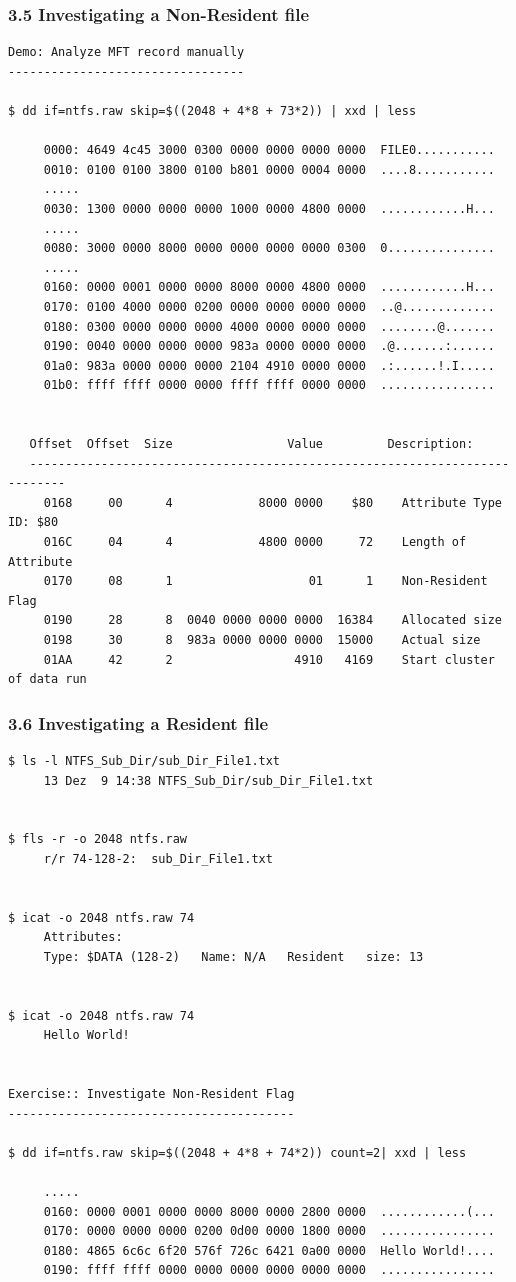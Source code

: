 \begin{frame}[fragile]
  \frametitle{3.5 Investigating a Non-Resident file}
  \begin{lstlisting}[basicstyle=\tiny]
Demo: Analyze MFT record manually
---------------------------------

$ dd if=ntfs.raw skip=$((2048 + 4*8 + 73*2)) | xxd | less

     0000: 4649 4c45 3000 0300 0000 0000 0000 0000  FILE0...........
     0010: 0100 0100 3800 0100 b801 0000 0004 0000  ....8...........
     .....
     0030: 1300 0000 0000 0000 1000 0000 4800 0000  ............H...
     .....
     0080: 3000 0000 8000 0000 0000 0000 0000 0300  0...............
     .....
     0160: 0000 0001 0000 0000 8000 0000 4800 0000  ............H...
     0170: 0100 4000 0000 0200 0000 0000 0000 0000  ..@.............
     0180: 0300 0000 0000 0000 4000 0000 0000 0000  ........@.......
     0190: 0040 0000 0000 0000 983a 0000 0000 0000  .@.......:......
     01a0: 983a 0000 0000 0000 2104 4910 0000 0000  .:......!.I.....
     01b0: ffff ffff 0000 0000 ffff ffff 0000 0000  ................


   Offset  Offset  Size                Value         Description:
   ---------------------------------------------------------------------------
     0168     00      4            8000 0000    $80    Attribute Type ID: $80
     016C     04      4            4800 0000     72    Length of Attribute
     0170     08      1                   01      1    Non-Resident Flag
     0190     28      8  0040 0000 0000 0000  16384    Allocated size
     0198     30      8  983a 0000 0000 0000  15000    Actual size
     01AA     42      2                 4910   4169    Start cluster of data run
  \end{lstlisting}
\end{frame}


\begin{frame}[fragile]
  \frametitle{3.6 Investigating a Resident file}
  \begin{lstlisting}[basicstyle=\tiny]
$ ls -l NTFS_Sub_Dir/sub_Dir_File1.txt
     13 Dez  9 14:38 NTFS_Sub_Dir/sub_Dir_File1.txt


$ fls -r -o 2048 ntfs.raw
     r/r 74-128-2:	sub_Dir_File1.txt


$ icat -o 2048 ntfs.raw 74
     Attributes: 
     Type: $DATA (128-2)   Name: N/A   Resident   size: 13


$ icat -o 2048 ntfs.raw 74
     Hello World!


Exercise:: Investigate Non-Resident Flag
----------------------------------------

$ dd if=ntfs.raw skip=$((2048 + 4*8 + 74*2)) count=2| xxd | less

     .....
     0160: 0000 0001 0000 0000 8000 0000 2800 0000  ............(...
     0170: 0000 0000 0000 0200 0d00 0000 1800 0000  ................
     0180: 4865 6c6c 6f20 576f 726c 6421 0a00 0000  Hello World!....
     0190: ffff ffff 0000 0000 0000 0000 0000 0000  ................
  \end{lstlisting}
\end{frame}


